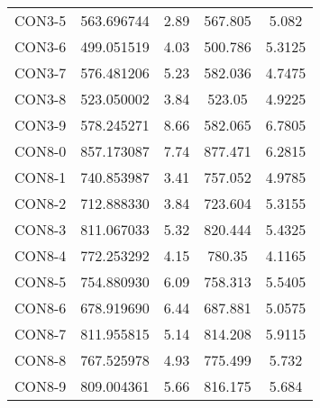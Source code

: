 \begin{table}[ht]
\begin{tabular}{c c c c c}
CON3-5 & 563.696744 & 2.89 & 567.805 & 5.082 \\
CON3-6 & 499.051519 & 4.03 & 500.786 & 5.3125 \\
CON3-7 & 576.481206 & 5.23 & 582.036 & 4.7475 \\
CON3-8 & 523.050002 & 3.84 & 523.05 & 4.9225 \\
CON3-9 & 578.245271 & 8.66 & 582.065 & 6.7805 \\
CON8-0 & 857.173087 & 7.74 & 877.471 & 6.2815 \\
CON8-1 & 740.853987 & 3.41 & 757.052 & 4.9785 \\
CON8-2 & 712.888330 & 3.84 & 723.604 & 5.3155 \\
CON8-3 & 811.067033 & 5.32 & 820.444 & 5.4325 \\
CON8-4 & 772.253292 & 4.15 & 780.35 & 4.1165 \\
CON8-5 & 754.880930 & 6.09 & 758.313 & 5.5405 \\
CON8-6 & 678.919690 & 6.44 & 687.881 & 5.0575 \\
CON8-7 & 811.955815 & 5.14 & 814.208 & 5.9115 \\
CON8-8 & 767.525978 & 4.93 & 775.499 & 5.732 \\
CON8-9 & 809.004361 & 5.66 & 816.175 & 5.684 \\
[1ex]\hline
\end{tabular}
\label{table:nonlin}
\end{table} \clearpage
